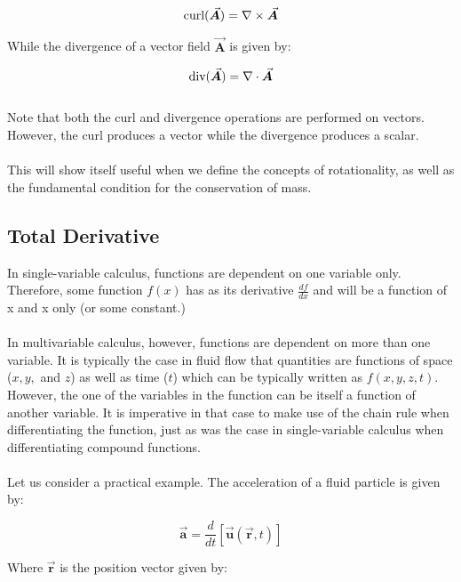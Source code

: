 \documentclass[11pt]{article}
\begin{document}
\begin{equation*}
    \textnormal{curl}(\vec{\bm{A}}) = \nabla \times \vec{\bm{A}}
\end{equation*}

\noindent
While the divergence of a vector field $\vec{\bm{A}}$ is given by:

\begin{equation*}
    \textnormal{div}(\vec{\bm{A}}) = \nabla \cdot \vec{\bm{A}}
\end{equation*} \\ 
\noindent
Note that both the curl and divergence operations are performed on vectors. However, the curl produces a vector while the divergence produces a scalar.\\ \\ 
\noindent
This will show itself useful when we define the concepts of rotationality, as well as the fundamental condition for the conservation of mass. \\

\subsection{Total Derivative}
\noindent
In single-variable calculus, functions are dependent on one variable only. Therefore, some function $f(x)$ has as its derivative $\frac{df}{dx}$ and will be a function of x and x only (or some constant.)\\ \\
\noindent
In multivariable calculus, however, functions are dependent on more than one variable. It is typically the case in fluid flow that quantities are functions of space ($x, y,$ and $z$) as well as time ($t$) which can be typically written as $f(x, y, z, t)$. However, the one of the variables in the function can be itself a function of another variable. It is imperative in that case to make use of the chain rule when differentiating the function, just as was the case in single-variable calculus when differentiating compound functions. \\ \\
\noindent
Let us consider a practical example. The acceleration of a fluid particle is given by:

\begin{equation*}
    \vec{\bm{a}} = \frac{d}{dt}[\vec{\bm{u}}(\vec{\bm{r}}, t)]
\end{equation*}

\noindent
Where $\vec{\bm{r}}$ is the position vector given by:
\end{document}
